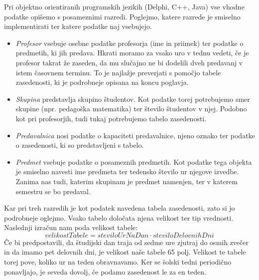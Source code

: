 \documentclass[a4paper,10pt]{article}
\begin{document}
Pri objektno orientiranih programskih jezikih (Delphi, C++, Java) vse vhodne podatke
opišemo s posameznimi razredi. Poglejmo, katere razrede je smiselno implementirati ter
katere podatke naj vsebujejo.


\begin{itemize}
   \item \emph{Profesor} vsebuje osebne podatke profesorja (ime in priimek) ter
   podatke o predmetih, ki jih predava. Hkrati moramo za vsako uro v tednu vedeti, če
   je profesor takrat že zaseden, da mu slučajno ne bi dodelili dveh predavanj v istem
   časovnem terminu. To je najlažje preverjati s pomočjo tabele zasedenosti, ki je
   podrobneje opisana na koncu poglavja.

   \item \emph{Skupina} predstavlja skupino študentov. Kot podatke torej potrebujemo
   smer skupine (npr. pedagoška matematika) ter število študentov v njej. Podobno kot pri
   profesorjih, tudi tukaj potrebujemo tabelo zasedenosti.

   \item \emph{Predavalnica} nosi podatke o kapaciteti predavalnice, njeno oznako
   ter podatke o zasedenosti, ki so predstavljeni s tabelo.

   \item \emph{Predmet} vsebuje podatke o posameznih predmetih. Kot podatke tega
   objekta je smiselno navesti ime predmeta ter tedensko število ur njegove izvedbe.
   Zanima nas tudi, katerim skupinam je predmet namenjen, ter v katerem semestru se bo
   predaval.
\end{itemize}
%
Kar pri treh razredih je kot podatek navedena tabela zasedenosti, zato si jo podrobneje
oglejmo. Vsako tabelo določata njena velikost ter tip vrednosti. Naslednji izračun nam
poda velikost tabele:
\[ velikostTabele = steviloUrNaDan \cdot steviloDelovnihDni \]
Če bi predpostavili, da študijski dan traja od sedme ure zjutraj do osmih zvečer in da
imamo pet delovnih dni, je velikost naše tabele 65 polj. Velikost te tabele torej pove,
koliko ur na teden obravnavamo. Ker se šolski tedni periodično ponavljajo, je seveda
dovolj, če podamo zasedenost le za en teden.
\end{document}
